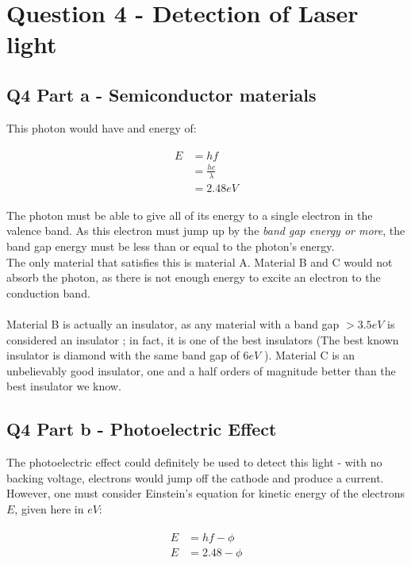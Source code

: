 \documentclass[paper=a4, fontsize=12pt]{scrartcl}
\begin{document}
\section{Question 4 - Detection of Laser light}
\subsection{Q4 Part a - Semiconductor materials}


This photon would have and energy of:

\begin{align*}
\begin{split}
E &= hf\\
&= \frac{hc}{\lambda}\\
&= 2.48 eV
\end{split}
\end{align*}

The photon must be able to give all of its energy to a single electron in the valence band. As this electron must jump up by the \textit{band gap energy or more}, the band gap energy must be less than or equal to the photon's energy.\\
The only material that satisfies this is material A. Material B and C would not absorb the photon, as there is not enough energy to excite an electron to the conduction band.\\\\

Material B is actually an insulator, as any material with a band gap $> 3.5 eV$ is considered an insulator \cite{Lectures}; in fact, it is one of the best insulators (The best known insulator is diamond with the same band gap of $6 eV$ \cite{Lectures}). Material C is an unbelievably good insulator, one and a half orders of magnitude better than the best insulator we know.

\subsection{Q4 Part b - Photoelectric Effect}

The photoelectric effect could definitely be used to detect this light - with no backing voltage, electrons would jump off the cathode and produce a current. However, one must consider Einstein's equation for kinetic energy of the electrons $E$, given here in $eV$:

\begin{align*}
\begin{split}
E &= hf - \phi\\
E &= 2.48 - \phi
\end{split}
\end{align*}
\end{document}
